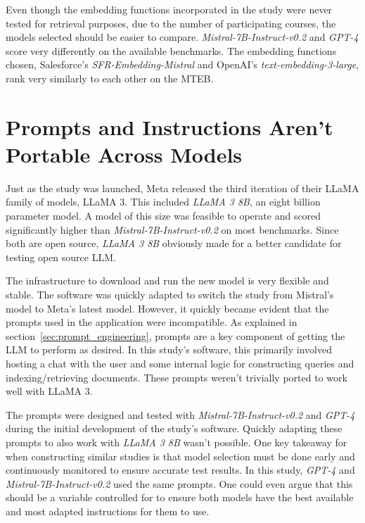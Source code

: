 Even though the embedding functions incorporated in the study were never tested for retrieval purposes, due to the number of participating courses, the models selected should be easier to compare. \textit{Mistral-7B-Instruct-v0.2} and \textit{GPT-4} score very differently on the available benchmarks. The embedding functions chosen, Salesforce’s \textit{SFR-Embedding-Mistral} and OpenAI’s \textit{text-embedding-3-large}, rank very similarly to each other on the \gls{MTEB}.


\section{Prompts and Instructions Aren't Portable Across Models}


Just as the study was launched, Meta released the third iteration of their LLaMA family of models, LLaMA 3. This included \textit{LLaMA 3 8B}, an eight billion parameter model. A model of this size was feasible to operate and scored significantly higher than \textit{Mistral-7B-Instruct-v0.2} on most benchmarks. Since both are open source, \textit{LLaMA 3 8B} obviously made for a better candidate for testing open source \gls{LLM}.


The infrastructure to download and run the new model is very flexible and stable. The software was quickly adapted to switch the study from Mistral’s model to Meta’s latest model. However, it quickly became evident that the prompts used in the application were incompatible. As explained in section~\ref{sec:prompt_engineering}, prompts are a key component of getting the \gls{LLM} to perform as desired. In this study's software, this primarily involved hosting a chat with the user and some internal logic for constructing queries and indexing/retrieving documents. These prompts weren’t trivially ported to work well with LLaMA 3.


The prompts were designed and tested with \textit{Mistral-7B-Instruct-v0.2} and \textit{GPT-4} during the initial development of the study's software. Quickly adapting these prompts to also work with \textit{LLaMA 3 8B} wasn’t possible. One key takeaway for when constructing similar studies is that model selection must be done early and continuously monitored to ensure accurate test results. In this study, \textit{GPT-4} and \textit{Mistral-7B-Instruct-v0.2} used the same prompts. One could even argue that this should be a variable controlled for to ensure both models have the best available and most adapted instructions for them to use.




